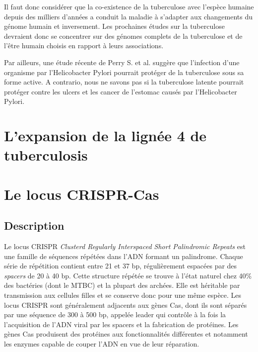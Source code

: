 \documentclass[twoside,a4paper,11pt,frenchb,openany]{report}
\begin{document}


Il faut donc considérer que la co-existence de la tuberculose avec l'espèce humaine depuis des milliers d'années a conduit la maladie à s'adapter aux changements du génome humain et inversement. Les prochaines études sur la tuberculose devraient donc se concentrer sur des génomes complets de la tuberculose et de l'être humain choisis en rapport à leurs associations.

Par ailleurs, une étude récente de Perry S. et al.\cite{perry1, perry2} suggère que l'infection d'une organisme par l'Helicobacter Pylori pourrait protéger de la tuberculose sous sa forme active. A contrario, nous ne savons pas si la tuberculose latente pourrait protéger contre les ulcers et les cancer de l'estomac causés par l'Helicobacter Pylori.




\section{L'expansion de la lignée 4 de tuberculosis}






\section{Le locus CRISPR-Cas}


\subsection{Description}

Le locus CRISPR \textit{Clusterd Regularly Interspaced Short Palindromic Repeats} est une famille de séquences répétées dans l'ADN formant un palindrome. Chaque série de répétition contient entre 21 et 37 bp, régulièrement espacées par des \textit{spacers} de 20 à 40 bp. Cette structure répétée se trouve à l'état naturel chez 40\% des bactéries (dont le MTBC) et la plupart des archées. Elle est héritable par transmission aux cellules filles et se conserve donc pour une même espèce. Les locus CRISPR sont généralement adjacents aux gènes Cas, dont ils sont séparés par une séquence de 300 à 500 bp, appelée leader qui contrôle à la fois la l'acquisition de l'ADN viral par les spacers et la fabrication de protéines. Les gènes Cas produisent des protéines aux fonctionnalités différentes et notamment les enzymes capable de couper l'ADN en vue de leur réparation.
\end{document}
